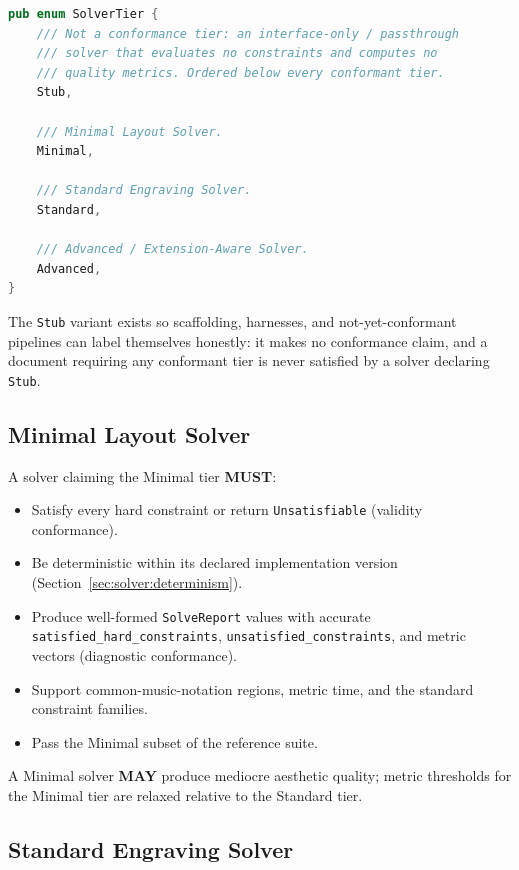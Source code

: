 \documentclass[11pt,letterpaper]{report}
\newcounter{requirement}[chapter]
\newcommand{\MUST}{\textbf{MUST}}
\newcommand{\MAY}{\textbf{MAY}}
\begin{document}
\begin{lstlisting}[language=Rust]
pub enum SolverTier {
    /// Not a conformance tier: an interface-only / passthrough
    /// solver that evaluates no constraints and computes no
    /// quality metrics. Ordered below every conformant tier.
    Stub,

    /// Minimal Layout Solver.
    Minimal,

    /// Standard Engraving Solver.
    Standard,

    /// Advanced / Extension-Aware Solver.
    Advanced,
}
\end{lstlisting}

The \texttt{Stub} variant exists so scaffolding, harnesses, and
not-yet-conformant pipelines can label themselves honestly: it makes
no conformance claim, and a document requiring any conformant tier
is never satisfied by a solver declaring \texttt{Stub}.

\subsection{Minimal Layout Solver}

\begin{requirement}
  \label{req:solver:minimal-tier}
  A solver claiming the Minimal tier \MUST{}:

  \begin{itemize}
    \item Satisfy every hard constraint or return
      \texttt{Unsatisfiable} (validity conformance).
    \item Be deterministic within its declared implementation
      version (Section~\ref{sec:solver:determinism}).
    \item Produce well-formed \texttt{SolveReport} values with
      accurate \texttt{satisfied\_hard\_constraints},
      \texttt{unsatisfied\_constraints}, and metric vectors
      (diagnostic conformance).
    \item Support common-music-notation regions, metric time, and
      the standard constraint families.
    \item Pass the Minimal subset of the reference suite.
  \end{itemize}

  A Minimal solver \MAY{} produce mediocre aesthetic quality;
  metric thresholds for the Minimal tier are relaxed relative to
  the Standard tier.
\end{requirement}

\subsection{Standard Engraving Solver}
\end{document}
